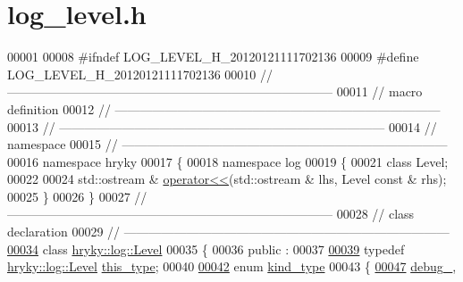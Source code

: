 \hypertarget{log__level_8h_source}{\section{log\-\_\-level.\-h}
}

\begin{DoxyCode}
00001 
00008 \textcolor{preprocessor}{#ifndef LOG\_LEVEL\_H\_20120121111702136}
00009 \textcolor{preprocessor}{}\textcolor{preprocessor}{#define LOG\_LEVEL\_H\_20120121111702136}
00010 \textcolor{preprocessor}{}\textcolor{comment}{//
      ------------------------------------------------------------------------------}
00011 \textcolor{comment}{// macro definition}
00012 \textcolor{comment}{//
      ------------------------------------------------------------------------------}
00013 \textcolor{comment}{//
      ------------------------------------------------------------------------------}
00014 \textcolor{comment}{// namespace}
00015 \textcolor{comment}{//
      ------------------------------------------------------------------------------}
00016 \textcolor{keyword}{namespace }hryky
00017 \{
00018 \textcolor{keyword}{namespace }log
00019 \{
00021     \textcolor{keyword}{class }Level;
00022 
00024     std::ostream & \hyperlink{namespacehryky_1_1log_a7cae8a06047228844df53c04f0b12bae}{operator<<}(std::ostream & lhs, Level \textcolor{keyword}{const} & rhs);
00025 \}
00026 \}
00027 \textcolor{comment}{//
      ------------------------------------------------------------------------------}
00028 \textcolor{comment}{// class declaration}
00029 \textcolor{comment}{//
      ------------------------------------------------------------------------------}
\hypertarget{log__level_8h_source_l00034}{}\hyperlink{classhryky_1_1log_1_1_level}{00034} \textcolor{comment}{}\textcolor{keyword}{class }\hyperlink{classhryky_1_1log_1_1_level}{hryky::log::Level}
00035 \{
00036 \textcolor{keyword}{public} :
00037 
\hypertarget{log__level_8h_source_l00039}{}\hyperlink{classhryky_1_1log_1_1_level_a2a7ccc2d552dfdf72dc1d543e18c4780}{00039}     \textcolor{keyword}{typedef} \hyperlink{classhryky_1_1log_1_1_level}{hryky::log::Level} \hyperlink{classhryky_1_1log_1_1_level_a2a7ccc2d552dfdf72dc1d543e18c4780}{this_type};
00040 
\hypertarget{log__level_8h_source_l00042}{}\hyperlink{classhryky_1_1log_1_1_level_a9e6bba8f272859b212f49e4478a863d7}{00042}     \textcolor{keyword}{enum} \hyperlink{classhryky_1_1log_1_1_level_a9e6bba8f272859b212f49e4478a863d7}{kind_type}
00043     \{
\hypertarget{log__level_8h_source_l00047}{}\hyperlink{classhryky_1_1log_1_1_level_a9e6bba8f272859b212f49e4478a863d7a9e66c9bec86b804ca7b483d470b3d1fc}{00047}         \hyperlink{classhryky_1_1log_1_1_level_a9e6bba8f272859b212f49e4478a863d7a9e66c9bec86b804ca7b483d470b3d1fc}{debug_},

\end{DoxyCode}
